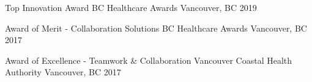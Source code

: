 
\begin{cvhonors}

  \cvhonor
    {Top Innovation Award} %
    {BC Healthcare Awards} %
    {Vancouver, BC} %
    {2019} %

  \cvhonor
    {Award of Merit - Collaboration Solutions} %
    {BC Healthcare Awards} %
    {Vancouver, BC} %
    {2017} %

  \cvhonor
    {Award of Excellence - Teamwork \& Collaboration} %
    {Vancouver Coastal Health Authority} %
    {Vancouver, BC} %
    {2017} %

\end{cvhonors}

